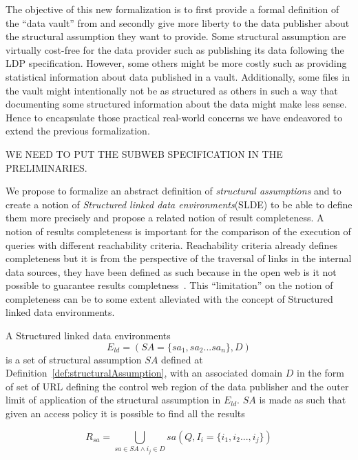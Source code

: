 The objective of this new formalization is to first provide a formal definition of the ``data vault'' from \citeauthor{Taelman2023} and secondly give more liberty to the data publisher about the structural assumption they want to provide.
Some structural assumption are virtually cost-free for the data provider such as publishing its data following the LDP specification.
However, some others might be more costly such as providing statistical information about data published in a vault.
Additionally, some files in the vault might intentionally not be as structured as others in such a way that documenting some structured information about the 
data might make less sense. Hence to encapsulate those practical real-world concerns we have endeavored to extend the previous formalization.

WE NEED TO PUT THE SUBWEB SPECIFICATION IN THE PRELIMINARIES.

\iffalse
We propose to formalize an abstract definition of \emph{structural assumptions} and to create a notion of \emph{Structured linked data environments}(SLDE)
to be able to define them more precisely and propose a related notion of result completeness.
A notion of results completeness is important for the comparison of the execution of queries with different reachability criteria.
Reachability criteria already defines completeness but it is from the perspective of the traversal of links in the internal data sources,
they have been defined as such because in the open web is it not possible to guarantee results completness~\cite{Hartig2012}.
This ``limitation'' on the notion of completeness can be to some extent alleviated with the concept of Structured linked data environments.

A Structured linked data environments 
\begin{equation}
E_{ld} = (SA=\{ sa_1, sa_2...sa_n\}, D)
\end{equation}
is a set of structural assumption $SA$  defined at Definition~\ref{def:structuralAssumption},
with an associated domain $D$ in the form of set of URL defining the control web region of the data publisher and the outer limit of application of the structural assumption in $E_{ld}$.
$SA$ is made as such that given an access policy it is possible to find all the results 

\begin{equation}
R_{sa} = \bigcup_{sa \in SA \land i_j \in D} sa(Q, I_{i} = \{i_1, i_2 ..., i_j\}) 
\end{equation}

